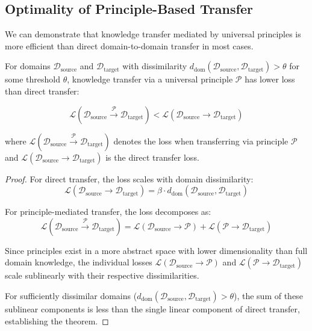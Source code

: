 \subsection{Optimality of Principle-Based Transfer}

We can demonstrate that knowledge transfer mediated by universal principles is more efficient than direct domain-to-domain transfer in most cases.

\begin{theorem}
For domains $\mathcal{D}_{\text{source}}$ and $\mathcal{D}_{\text{target}}$ with dissimilarity $d_{\text{dom}}(\mathcal{D}_{\text{source}}, \mathcal{D}_{\text{target}}) > \theta$ for some threshold $\theta$, knowledge transfer via a universal principle $\mathcal{P}$ has lower loss than direct transfer:

\begin{equation}
\mathcal{L}(\mathcal{D}_{\text{source}} \xrightarrow{\mathcal{P}} \mathcal{D}_{\text{target}}) < \mathcal{L}(\mathcal{D}_{\text{source}} \rightarrow \mathcal{D}_{\text{target}})
\end{equation}

where $\mathcal{L}(\mathcal{D}_{\text{source}} \xrightarrow{\mathcal{P}} \mathcal{D}_{\text{target}})$ denotes the loss when transferring via principle $\mathcal{P}$ and $\mathcal{L}(\mathcal{D}_{\text{source}} \rightarrow \mathcal{D}_{\text{target}})$ is the direct transfer loss.
\end{theorem}

\begin{proof}
For direct transfer, the loss scales with domain dissimilarity:
\begin{equation}
\mathcal{L}(\mathcal{D}_{\text{source}} \rightarrow \mathcal{D}_{\text{target}}) = \beta \cdot d_{\text{dom}}(\mathcal{D}_{\text{source}}, \mathcal{D}_{\text{target}})
\end{equation}

For principle-mediated transfer, the loss decomposes as:
\begin{equation}
\mathcal{L}(\mathcal{D}_{\text{source}} \xrightarrow{\mathcal{P}} \mathcal{D}_{\text{target}}) = \mathcal{L}(\mathcal{D}_{\text{source}} \rightarrow \mathcal{P}) + \mathcal{L}(\mathcal{P} \rightarrow \mathcal{D}_{\text{target}})
\end{equation}

Since principles exist in a more abstract space with lower dimensionality than full domain knowledge, the individual losses $\mathcal{L}(\mathcal{D}_{\text{source}} \rightarrow \mathcal{P})$ and $\mathcal{L}(\mathcal{P} \rightarrow \mathcal{D}_{\text{target}})$ scale sublinearly with their respective dissimilarities.

For sufficiently dissimilar domains ($d_{\text{dom}}(\mathcal{D}_{\text{source}}, \mathcal{D}_{\text{target}}) > \theta$), the sum of these sublinear components is less than the single linear component of direct transfer, establishing the theorem.
\end{proof}

